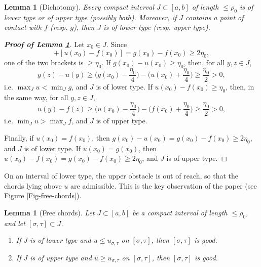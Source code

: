 \documentclass[reqno,12pt]{amsart}
\numberwithin{equation}{section}
\newtheorem{lemma}[theorem]{Lemma}
\theoremstyle{remark}
\begin{document}
\begin{lemma}[Dichotomy]\label{L-dicho}
Every compact interval $J\subset[a,b]$ of length $\leq\rho_0$ is of lower type or of upper type {\rm(}possibly both{\rm)}. Moreover, if $J$ contains a point of contact with $f$ {\rm(}resp. $g${\rm)}, then $J$ is of lower type {\rm(}resp. upper type{\rm)}.
\end{lemma}

\begin{proof}[\bf Proof of Lemma \ref{L-dicho}]
Let $x_0\in J$. Since
\begin{equation*}
[g(x_0)-u(x_0)]+[u(x_0)-f(x_0)]=g(x_0)-f(x_0)\geq2\eta_0,
\end{equation*}
one of the two brackets is $\geq\eta_0$. If $g(x_0)-u(x_0)\geq\eta_0$, then, for all $y,z\in J$,
\begin{equation*}
g(z)-u(y)\geq\Big(g(x_0)-\frac{\eta_0}4\Big)-\Big(u(x_0)+\frac{\eta_0}4\Big)\geq\frac{\eta_0}2>0,
\end{equation*}
i.e. $\max_Ju<\min_Jg$, and $J$ is of lower type. If $u(x_0)-f(x_0)\geq\eta_0$, then, in the same way, for all $y,z\in J$,
\begin{equation*}
u(y)-f(z)\geq\Big(u(x_0)-\frac{\eta_0}4\Big)-\Big(f(x_0)+\frac{\eta_0}4\Big)\geq\frac{\eta_0}2>0,
\end{equation*}
i.e. $\min_Ju>\max_Jf$, and $J$ is of upper type.

\smallskip

Finally, if $u(x_0)=f(x_0)$, then $g(x_0)-u(x_0)=g(x_0)-f(x_0)\geq2\eta_0$, and $J$ is of lower type. If $u(x_0)=g(x_0)$, then $u(x_0)-f(x_0)=g(x_0)-f(x_0)\geq2\eta_0$, and $J$ is of upper type.
\end{proof}

On an interval of lower type, the upper obstacle is out of reach, so that the chords lying above $u$ are admissible. This is the key observation of the paper (see Figure \ref{Fig-free-chords}).

\begin{lemma}[Free chords]\label{L-free}
Let $J\subset[a,b]$ be a compact interval of length $\leq\rho_0$, and let $[\sigma,\tau]\subset J$.
\begin{enumerate}[leftmargin=3em, itemsep=0.3em, topsep=0.3em]
\item[{\rm(i)}] If $J$ is of lower type and $u\leq u_{\sigma,\tau}$ on $[\sigma,\tau]$, then $[\sigma,\tau]$ is good.
\item[{\rm(ii)}] If $J$ is of upper type and $u\geq u_{\sigma,\tau}$ on $[\sigma,\tau]$, then $[\sigma,\tau]$ is good.
\end{enumerate}
\end{lemma}
\end{document}
